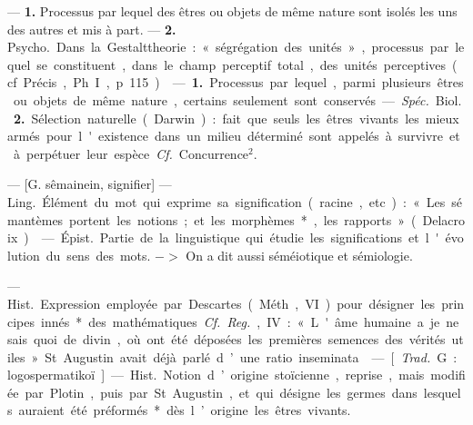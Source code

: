 \begin{itemize}[leftmargin=1cm, label=, itemsep=1pt]
 — {\bf 1.} Processus par lequel
des êtres ou objets de même nature
sont isolés les uns des autres et mis
à part. — {\bf 2.} \si{Psycho.} Dans la Gestalttheorie : « ségrégation des unités »,
processus par lequel se constituent,
dans le champ perceptif total,
des unités perceptives (cf. Précis,
Ph. I, p. 115).

 — {\bf 1.} Processus par lequel,
parmi plusieurs êtres ou objets de
même nature, certains seulement
sont conservés.

— {\it Spéc.} \si{Biol.} {\bf 2.} Sélection naturelle (Darwin) : fait que seuls les
êtres vivants les mieux armés pour
l'existence dans un milieu déterminé sont appelés à survivre et à perpétuer leur espèce. {\it Cf.} Concurrence$^2$.

 — [G. sêmainein, signifier] —
\si{Ling.} Élément du mot qui exprime
sa signification (racine, etc.) : « Les
sémantèmes portent les notions; et
les morphèmes*, les rapports »
(Delacroix).

 — \si{Épist.} Partie de la
linguistique qui étudie les significations et l'évolution du sens des mots.
$->$ On a dit aussi séméiotique et
sémiologie.

 — \si{Hist.} Expression employée par Descartes (Méth.,
VI) pour désigner les principes
innés* des mathématiques. {\it Cf.} {\it Reg.},
IV : « L'âme humaine a je ne sais
quoi de divin, où ont été déposées
les premières semences des vérités
utiles. » St. Augustin avait déjà
parlé d’une ratio inseminata.

 — [{\it Trad.} G. : logospermatikoï] — \si{Hist.} Notion d’origine stoïcienne, reprise, mais modifiée par Plotin, puis par St Augustin, et qui désigne les germes dans
lesquels auraient été préformés* dès
l’origine les êtres vivants.


\end{itemize}
